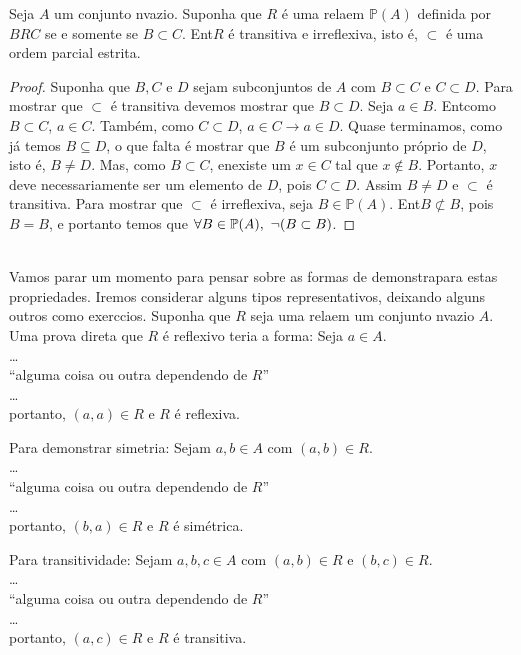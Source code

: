\begin{teob}
Seja $A$ um conjunto n\ao vazio. Suponha que $R$ \'e uma rela\cao em $\mathbb{P}(A)$ definida por $BRC$ se e somente se $B\subset C$. Ent\ao $R$ \'e transitiva e irreflexiva, isto \'e, $\subset$ \'e uma ordem parcial estrita.
\end{teob}
\begin{proof}
Suponha que $B,C$ e $D$ sejam subconjuntos de $A$ com $B\subset C$ e $C\subset D$. Para mostrar que $\subset$ \'e transitiva devemos mostrar que $B\subset D$.  Seja $a\in B$. Ent\ao como $B\subset C$, $a\in C$.  Tamb\'em, como $C\subset D$, $a\in C\to a\in D$. Quase terminamos, como j\'a temos $B\subseteq D$, o que falta \'e mostrar que $B$ \'e um subconjunto pr\'oprio de $D$, isto \'e, $B\neq D$. Mas, como $B\subset C$, en\tao existe um $x\in C$ tal que $x\notin B$. Portanto, $x$ deve necessariamente ser um elemento de $D$, pois $C\subset D$. Assim $B\neq D$ e $\subset$ \'e transitiva. Para mostrar que $\subset$ \'e irreflexiva, seja $B\in \mathbb{P}(A)$. Ent\ao $B\not\subset B$, pois $B=B$, e portanto temos que $\forall B\in \mathbb{P}(A),\textrm{ }\lnot(B\subset B)$.
\end{proof}
\\

Vamos parar um momento para pensar sobre as formas de demonstra\cao para estas propriedades. Iremos considerar alguns tipos representativos, deixando alguns outros como exerc\ih cios. Suponha que $R$ seja uma rela\cao em um conjunto n\ao vazio $A$. Uma prova direta que $R$ \'e reflexivo teria a forma: Seja $a\in A$.
\\
\ldots
\\ 
``alguma coisa ou outra dependendo de $R$''
\\
\ldots
\\
portanto, $(a,a)\in R$ e $R$ \'e reflexiva.

Para demonstrar simetria: Sejam $a,b\in A$ com $(a,b)\in R$.
\\
\ldots
\\ 
``alguma coisa ou outra dependendo de $R$''
\\
\ldots
\\
portanto, $(b,a)\in R$ e $R$ \'e sim\'etrica.

Para transitividade: Sejam $a,b,c\in A$ com $(a,b)\in R$ e $(b,c)\in R$.
\\
\ldots
\\ 
``alguma coisa ou outra dependendo de $R$''
\\
\ldots
\\
portanto, $(a,c)\in R$ e $R$ \'e transitiva.


